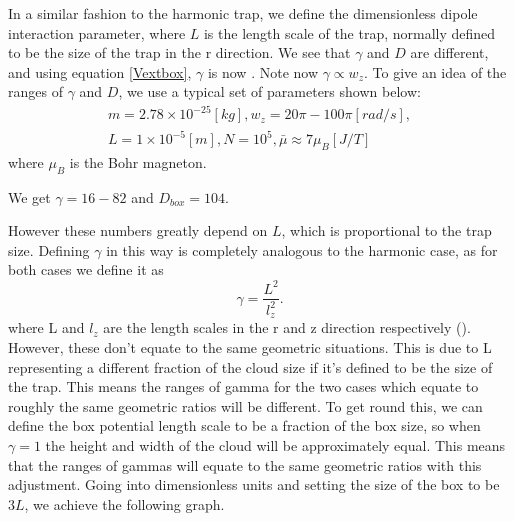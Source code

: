 \documentclass[10pt]{article}
\numberwithin{equation}{section}
\begin{document}
\begin{multicols}{2}
 In a similar fashion to the harmonic trap, we define the dimensionless dipole interaction parameter,  where $L$ is the length scale of the trap, normally defined to be the size of the trap in the r direction.
We see that $\gamma$ and $D$ are different, and using equation \eqref{Vextbox}, $\gamma$ is now . Note now $\gamma \propto w_z$. 
To give an idea of the ranges of $\gamma$ and $D$, we use a typical set of parameters shown below:
\begin{align*}
m=2.78\times10^{-25}[kg], w_z=20\pi-100\pi[rad/s], \\ L=1\times10^{-5}[m], N=10^5, \bar{\mu}\approx 7\mu_B [J/T]
\end{align*}
where $\mu_B$ is the Bohr magneton.

We get $\gamma = 16-82$ and $D_{box}=104$.

However these numbers greatly depend on $L$, which is proportional to the trap size. 
Defining $\gamma$ in this way is completely analogous to the harmonic case, as for both cases we define it as 
\begin{equation}
\gamma = \frac{L^{2}}{l_{z}^{2}}.
\end{equation}
where L and $l_{z}$ are the length scales in the r and z direction respectively (). However, these don't equate to the same geometric situations. This is due to L representing a different fraction of the cloud size if it's defined to be the size of the trap. This means  the ranges of gamma for the two cases which equate to roughly the same geometric ratios will be different. To get round this, we can define the box potential length scale to be a fraction of the box size, so when $\gamma =1$ the height and width of the cloud will be approximately equal. This means that the ranges of gammas will equate to the same geometric ratios with this adjustment. 
Going into dimensionless units and setting the size of the box to be $3L$, we achieve the following graph.


\end{multicols}
\end{document}
